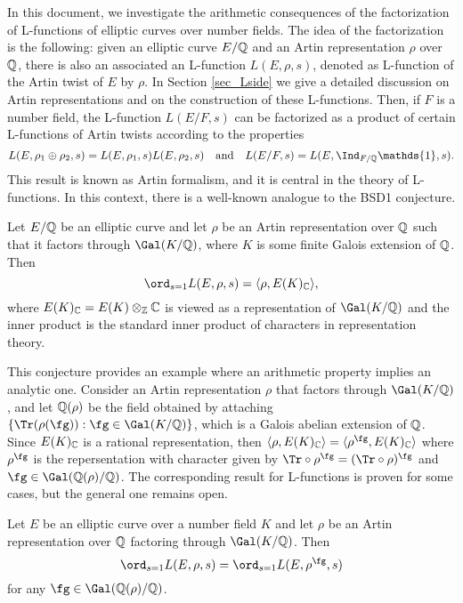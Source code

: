 In this document, we investigate the arithmetic consequences of the factorization of L-functions of elliptic curves over number fields. The idea of the factorization is the following: given an elliptic curve $E/\mathbb{Q}$ and an Artin representation $\rho$ over $\mathbb{Q}$, there is also an associated an L-function $L(E,\rho,s)$, denoted as L-function of the Artin twist of $E$ by $\rho$. In Section \ref{sec_Lside} we give a detailed discussion on Artin representations and on the construction of these L-functions. Then, if $F$ is a number field, the L-function $L(E/F,s)$ can be factorized as a product of certain L-functions of Artin twists according to the properties
$$L(E,\rho_1\oplus\rho_2,s)=L(E,\rho_1,s)L(E,\rho_2,s)\quad\text{and}\quad L(E/F,s)=L(E,\Ind_{F/\QQ}\mathds{1},s).$$
This result is known as Artin formalism, and it is central in the theory of L-functions. In this context, there is a well-known analogue to the BSD1 conjecture. 

\begin{conj}\label{conj_BSD1Artin}
    Let $E/\mathbb{Q}$ be an elliptic curve and let $\rho$ be an Artin representation over $\mathbb{Q}$ such that it factors through $\Gal(K/\QQ)$, where $K$ is some finite Galois extension of $\mathbb{Q}$. Then
    $$\ord_{s=1}L(E,\rho,s)=\langle\rho,E(K)_{\CC}\rangle,$$
    where $E(K)_{\mathbb{C}}=E(K)\otimes_{\mathbb{Z}}\mathbb{C}$ is viewed as a representation of $\Gal(K/\QQ)$ and the inner product is the standard inner product of characters in representation theory.
\end{conj}

This conjecture provides an example where an arithmetic property implies an analytic one. Consider an Artin representation $\rho$ that factors through $\Gal(K/\QQ)$, and let $\mathbb{Q}(\rho)$ be the field obtained by attaching $\{\Tr(\rho(\fg)):\fg\in\Gal(K/\QQ)\}$, which is a Galois abelian extension of $\mathbb{Q}$. Since $E(K)_{\mathbb{C}}$ is a rational representation, then $\langle\rho,E(K)_{\CC}\rangle=\langle\rho^{\fg},E(K)_{\CC}\rangle$ where $\rho^{\fg}$ is the repersentation with character given by $\Tr\circ\rho^{\fg}=(\Tr\circ\rho)^{\fg}$ and $\fg\in\Gal(\QQ(\rho)/\QQ)$. The corresponding result for L-functions is proven for some cases, but the general one remains open.

\begin{conj}
    Let $E$ be an elliptic curve over a number field $K$ and let $\rho$ be an Artin representation over $\mathbb{Q}$ factoring through $\Gal(K/\QQ)$. Then
    $$\ord_{s=1}L(E,\rho,s)=\ord_{s=1}L(E,\rho^{\fg},s)$$
    for any $\fg\in\Gal(\QQ(\rho)/\QQ)$.
\end{conj}


